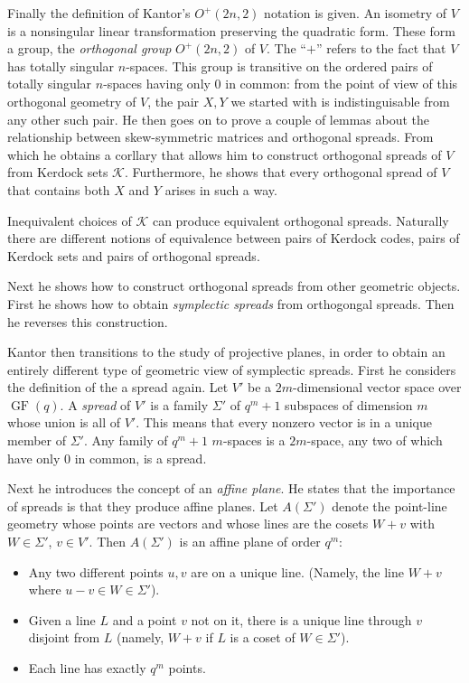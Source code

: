 \documentclass[a4paper]{article}
\DeclareMathOperator{\GF}{GF}
\begin{document}
  Finally the definition of Kantor's $O^{+}(2n,2)$ notation
  is given. An isometry of $V$ is a nonsingular linear
  transformation preserving the quadratic form. These form a
  group, the \textit{orthogonal group} $O^{+}(2n,2)$ of $V$.
  The ``$+$'' refers to the fact that  $V$ has totally
  singular $n$-spaces. This group is transitive on the
  ordered pairs of totally singular $n$-spaces having only
  $0$ in common: from the point of view of this orthogonal
  geometry of $V$, the pair $X,Y$ we started with is
  indistinguisable from any other such pair. He then goes on
  to prove a couple of lemmas about the relationship between
  skew-symmetric matrices and orthogonal spreads. From which
  he obtains a corllary that allows him to construct
  orthogonal spreads of $V$ from Kerdock sets $\mathcal K$.
  Furthermore, he shows that every orthogonal spread of $V$ 
  that contains both $X$ and $Y$ arises in such a way.
  
  Inequivalent choices of $\mathcal K$ can produce
  equivalent orthogonal spreads. Naturally there are
  different notions of equivalence between pairs of Kerdock
  codes, pairs of Kerdock sets and pairs of orthogonal
  spreads.

  Next he shows how to construct orthogonal spreads from
  other geometric objects. First he shows how to obtain
  \textit{symplectic spreads} from orthogongal spreads. Then
  he reverses this construction.

  Kantor then transitions to the study of projective planes,
  in order to obtain an entirely different type of geometric
  view of symplectic spreads. First he considers the
  definition of the a spread again. Let $V'$ be a
  $2m$-dimensional vector space over $\GF(q)$. A
  \textit{spread} of $V'$ is a family $\Sigma'$ of $q^{m}+1$ 
  subspaces of dimension $m$ whose union is all of $V'$.
  This means that every nonzero vector is in a unique member
  of $\Sigma'$. Any family of $q^{m}+1$ $m$-spaces is a
  $2m$-space, any two of which have only $0$ in common, is a
  spread.

  Next he introduces the concept of an \textit{affine
  plane}. He states that the importance of spreads is that
  they produce affine planes. Let $A(\Sigma')$ denote the
  point-line geometry whose points are vectors and whose
  lines are the cosets $W + v$ with $W \in \Sigma'$, $v \in
  V'$. Then $A(\Sigma')$ is an affine plane of order
  $q^{m}$:
  \begin{itemize}
    \item Any two different points $u,v$ are on a unique
      line. (Namely, the line $W+v$ where $u-v \in W \in
      \Sigma'$).
    \item Given a line $L$ and a point $v$ not on it, there
      is a unique line through $v$ disjoint from $L$ 
      (namely, $W+v$ if $L$ is a coset of $W \in \Sigma'$).
    \item Each line has exactly $q^{m}$ points.
  \end{itemize}
\end{document}

